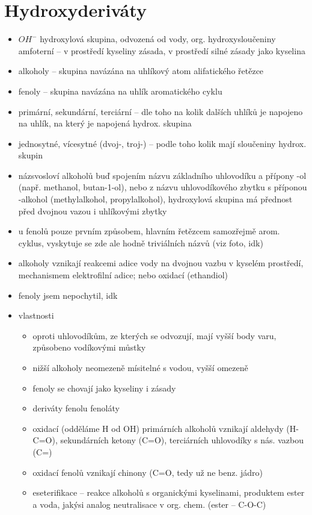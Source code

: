 \documentclass{article}
\begin{document}
\section{Hydroxyderiváty}
\begin{itemize}
  \item $OH^-$ hydroxylová skupina, odvozená od vody, org. hydroxysloučeniny amfoterní -- v prostředí kyseliny zásada, v prostředí silné zásady jako kyselina
  \item alkoholy -- skupina navázána na uhlíkový atom alifatického řetězce
  \item fenoly -- skupina navázána na uhlík aromatického cyklu
  \item primární, sekundární, terciární -- dle toho na kolik dalších uhlíků je napojeno na uhlík, na který je napojená hydrox. skupina
  \item jednosytné, vícesytné (dvoj-, troj-) -- podle toho kolik mají sloučeniny hydrox. skupin
  \item názsvosloví alkoholů buď spojením názvu základního uhlovodíku a přípony -ol (např. methanol, butan-1-ol), nebo z názvu uhlovodíkového zbytku s příponou -alkohol (methylalkohol, propylalkohol), hydroxylová skupina má přednost před dvojnou vazou i uhlíkovými zbytky
  \item u fenolů pouze prvním způsobem, hlavním řetězcem samozřejmě arom. cyklus, vyskytuje se zde ale hodně triviálních názvů (viz foto, idk)
  \item alkoholy vznikají reakcemi adice vody na dvojnou vazbu v kyselém prostředí, mechanismem elektrofilní adice; nebo oxidací (ethandiol)
  \item fenoly jsem nepochytil, idk
  \item vlastnosti
  \begin{itemize}
    \item oproti uhlovodíkům, ze kterých se odvozují, mají vyšší body varu, způsobeno vodíkovými můstky
    \item nižší alkoholy neomezeně mísitelné s vodou, vyšší omezeně
    \item fenoly se chovají jako kyseliny i zásady
    \item deriváty fenolu fenoláty
    \item oxidací (odděláme H od OH) primárních alkoholů vznikají aldehydy (H-C=O), sekundárních ketony (C=O), terciárních uhlovodíky s nás. vazbou (C=)
    \item oxidací fenolů vznikají chinony (C=O, tedy už ne benz. jádro)
    \item eseterifikace -- reakce alkoholů s organickými kyselinami, produktem ester a voda, jakýsi analog neutralisace v org. chem. (ester -- C-O-C)

\end{itemize}
\end{itemize}
\end{document}

